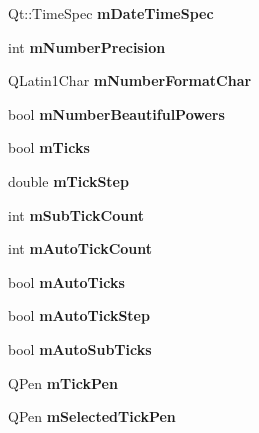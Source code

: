 \begin{DoxyCompactItemize}
Qt\+::\+Time\+Spec {\bfseries m\+Date\+Time\+Spec}
\item 
\mbox{\label{class_q_c_p_axis_acd76e8c783384d99ccc4a13797eec188}} 
int {\bfseries m\+Number\+Precision}
\item 
\mbox{\label{class_q_c_p_axis_a39594313deef458f425bba25cd337a8a}} 
Q\+Latin1\+Char {\bfseries m\+Number\+Format\+Char}
\item 
\mbox{\label{class_q_c_p_axis_af03809bee3f3e35fcc38d25b6dd5003b}} 
bool {\bfseries m\+Number\+Beautiful\+Powers}
\item 
\mbox{\label{class_q_c_p_axis_ab111e74bba22e06848897c932fc549fe}} 
bool {\bfseries m\+Ticks}
\item 
\mbox{\label{class_q_c_p_axis_a4fe96830fc5a2711e20fe5edccfe2ed3}} 
double {\bfseries m\+Tick\+Step}
\item 
\mbox{\label{class_q_c_p_axis_ad70198e6ae2801fc409bc3caec707da9}} 
int {\bfseries m\+Sub\+Tick\+Count}
\item 
\mbox{\label{class_q_c_p_axis_a499fbb67111e4b204738f6c1aa28d842}} 
int {\bfseries m\+Auto\+Tick\+Count}
\item 
\mbox{\label{class_q_c_p_axis_aac23adcbae246bf165d4539ad65ac9f9}} 
bool {\bfseries m\+Auto\+Ticks}
\item 
\mbox{\label{class_q_c_p_axis_aada8934a5c44978653031782aa37d101}} 
bool {\bfseries m\+Auto\+Tick\+Step}
\item 
\mbox{\label{class_q_c_p_axis_aaae980b0d193d959674e314dbb6c2c3b}} 
bool {\bfseries m\+Auto\+Sub\+Ticks}
\item 
\mbox{\label{class_q_c_p_axis_a1d52c78c856d8bd1f331d4ec4e63d944}} 
Q\+Pen {\bfseries m\+Tick\+Pen}
\item 
\mbox{\label{class_q_c_p_axis_a9524593dbc75a5c5b29dbd1cb4b37df5}} 
Q\+Pen {\bfseries m\+Selected\+Tick\+Pen}

\end{DoxyCompactItemize}
